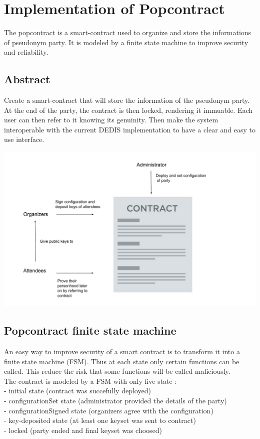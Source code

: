 \documentclass[11pt, a4paper, twoside, openright]{book} %
\begin{document}
\section{Implementation of Popcontract}
The popcontract is a smart-contract used to organize and store the informations of pseudonym party. It is modeled by a finite state machine to improve security and reliability.
\subsection{Abstract}
Create a smart-contract that will store the information of the pseudonym party. At the end of the party, the contract is then locked, rendering it immuable. Each user can then refer to it knowing its genuinity.
Then make the system interoperable with the current DEDIS implementation to have a clear and easy to use interface.   


  
  \begin{minipage}{1\linewidth}
    \includegraphics[scale = 0.67]{popcontract.pdf}
\end{minipage}%
  
\subsection{Popcontract finite state machine}
An easy way to improve security of a smart contract is to transform it into a finite state machine (FSM). Thus at each state only certain functions can be called. This reduce the risk that some functions will be called maliciously.\\ The contract is modeled by a FSM with only five state : \\- initial state (contract was succefully deployed)\\ - configurationSet state (administrator provided the details of the party) \\ - configurationSigned state (organizers agree with the configuration) \\ - key-deposited state (at least one keyset was sent to contract)\\ - locked (party ended and final keyset was choosed)
\end{document}
